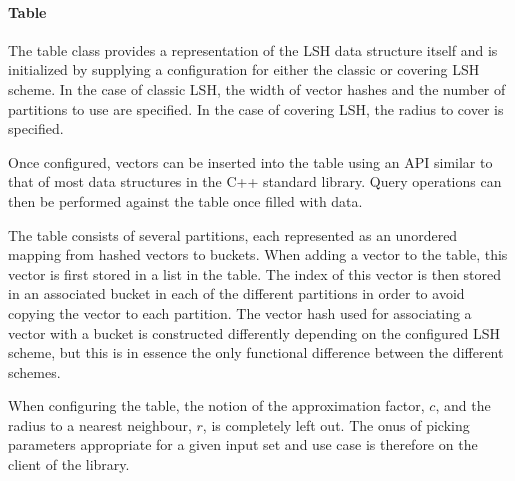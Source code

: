 \paragraph{Table} The table class provides a representation of the LSH data structure itself and is initialized by supplying a configuration for either the classic or covering LSH scheme. In the case of classic LSH, the width of vector hashes and the number of partitions to use are specified. In the case of covering LSH, the radius to cover is specified.

Once configured, vectors can be inserted into the table using an API similar to that of most data structures in the C++ standard library. Query operations can then be performed against the table once filled with data.

The table consists of several partitions, each represented as an unordered mapping from hashed vectors to buckets. When adding a vector to the table, this vector is first stored in a list in the table. The index of this vector is then stored in an associated bucket in each of the different partitions in order to avoid copying the vector to each partition. The vector hash used for associating a vector with a bucket is constructed differently depending on the configured LSH scheme, but this is in essence the only functional difference between the different schemes.

When configuring the table, the notion of the approximation factor, $c$, and the radius to a nearest neighbour, $r$, is completely left out. The onus of picking parameters appropriate for a given input set and use case is therefore on the client of the library.
